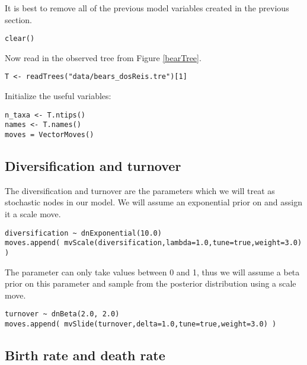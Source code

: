 It is best to remove all of the previous model variables created in the previous section.
{\tt \begin{snugshade*}
\begin{lstlisting}
clear()
\end{lstlisting}
\end{snugshade*}}

Now read in the observed tree from Figure \ref{bearTree}. 
{\tt \begin{snugshade*}
\begin{lstlisting}
T <- readTrees("data/bears_dosReis.tre")[1]
\end{lstlisting}
\end{snugshade*}}

Initialize the useful variables:
{\tt \begin{snugshade*}
\begin{lstlisting}
n_taxa <- T.ntips()
names <- T.names()
moves = VectorMoves() 
\end{lstlisting}
\end{snugshade*}}

\subsection{Diversification and turnover}

The diversification and turnover are the parameters which we will treat as stochastic nodes in our model. 
We will assume an exponential prior on  and assign it a scale move.
{\tt \begin{snugshade*}
\begin{lstlisting}
diversification ~ dnExponential(10.0) 
moves.append( mvScale(diversification,lambda=1.0,tune=true,weight=3.0)  )
\end{lstlisting}
\end{snugshade*}}

The  parameter can only take values between 0 and 1, thus we will assume a beta prior on this parameter and sample from the posterior distribution using a scale move.
{\tt \begin{snugshade*}
\begin{lstlisting}
turnover ~ dnBeta(2.0, 2.0) 
moves.append( mvSlide(turnover,delta=1.0,tune=true,weight=3.0) )
\end{lstlisting}
\end{snugshade*}}

\subsection{Birth rate and death rate}

